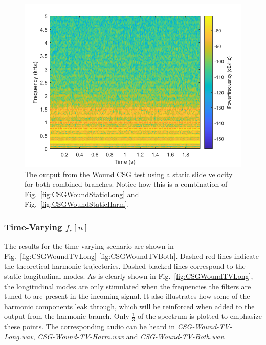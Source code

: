 \documentclass[../main.tex]{subfiles}
\begin{document}
\begin{figure}[h!]
    \centering
    \includegraphics[scale=.60]{./images/plots/CSG_Wound_Static_Both.png}
    \caption{The output from the Wound CSG test using a static slide velocity for both combined branches. Notice how this is a combination of Fig.~\ref{fig:CSGWoundStaticLong} and Fig.~\ref{fig:CSGWoundStaticHarm}.}
    \label{fig:CSGWoundStaticBoth}
\end{figure}

\clearpage

\subsubsection{Time-Varying $f_c[n]$}
The results for the time-varying scenario are shown in Fig.~\ref{fig:CSGWoundTVLong}-\ref{fig:CSGWoundTVBoth}. Dashed red lines indicate the theoretical harmonic trajectories. Dashed blacked lines correspond to the static longitudinal modes. As is clearly shown in Fig.~\ref{fig:CSGWoundTVLong}, the longitudinal modes are only stimulated when the frequencies the filters are tuned to are present in the incoming signal. It also illustrates how some of the harmonic components leak through, which will be reinforced when added to the output from the harmonic branch. Only $\frac{1}{3}$ of the spectrum is plotted to emphasize these points. The corresponding audio can be heard in \emph{CSG-Wound-TV-Long.wav}, \emph{CSG-Wound-TV-Harm.wav} and \emph{CSG-Wound-TV-Both.wav}.
\end{document}
